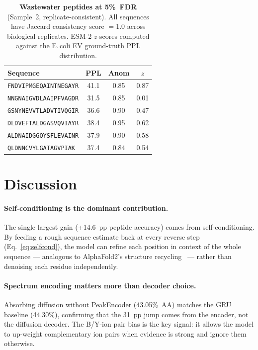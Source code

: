 \documentclass{article}
\begin{document}
\begin{table}[t]
  \centering
  \caption{
    \textbf{Wastewater peptides at 5\%~FDR} (Sample~2, replicate-consistent).
    All sequences have Jaccard consistency score $= 1.0$ across biological replicates.
    ESM-2 $z$-scores computed against the E.\,coli EV ground-truth PPL distribution.
  }
  \label{tab:wastewater}
  \scriptsize
  \setlength{\tabcolsep}{3pt}
  \begin{tabular}{lccc}
    \toprule
    Sequence & PPL & Anom & $z$ \\
    \midrule
    \texttt{FNDVIPMGEQAINTNEGAYR} & 41.1 & 0.85 & 0.87 \\
    \texttt{NNGNAIGVDLAAIPFVAGDR} & 31.5 & 0.85 & 0.01 \\
    \texttt{GSNYNEVVTLADVTIVQGIR} & 36.6 & 0.90 & 0.47 \\
    \texttt{DLDVEFTALDGASVQVIAYR} & 38.4 & 0.95 & 0.62 \\
    \texttt{ALDNAIDGGQYSFLEVAINR} & 37.9 & 0.90 & 0.58 \\
    \texttt{QLDNNCVYLGATAGVPIAK}  & 37.4 & 0.84 & 0.54 \\
    \bottomrule
  \end{tabular}
\end{table}

\section{Discussion}

\paragraph{Self-conditioning is the dominant contribution.}
The single largest gain (+14.6~pp peptide accuracy) comes from self-conditioning.
By feeding a rough sequence estimate back at every reverse step (Eq.~\ref{eq:selfcond}), the model
can refine each position in context of the whole sequence — analogous to AlphaFold2's structure
recycling~\citep{jumper2021highly} — rather than denoising each residue independently.

\paragraph{Spectrum encoding matters more than decoder choice.}
Absorbing diffusion without PeakEncoder (43.05\%~AA) matches the GRU baseline (44.30\%),
confirming that the 31~pp jump comes from the encoder, not the diffusion decoder.
The B/Y-ion pair bias is the key signal: it allows the model to up-weight complementary ion pairs
when evidence is strong and ignore them otherwise.
\end{document}
